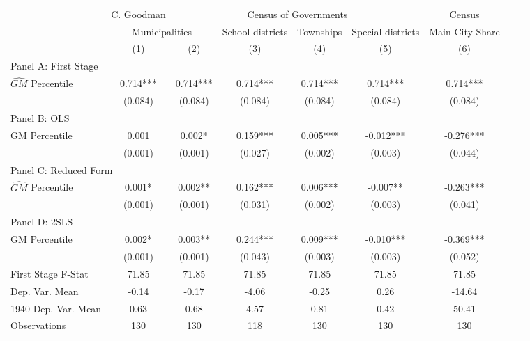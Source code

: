  \begin{tabular}{l*{8}{c}} \toprule
&\multicolumn{1}{c}{C. Goodman}&\multicolumn{4}{c}{Census of Governments}&\multicolumn{1}{c}{Census}\\\cmidrule(lr){2-2}\cmidrule(lr){3-6}\cmidrule(lr){7-7}
&\multicolumn{2}{c}{Municipalities}&\multicolumn{1}{c}{School districts}&\multicolumn{1}{c}{Townships}&\multicolumn{1}{c}{Special districts}&\multicolumn{1}{c}{Main City Share}\\\cmidrule(lr){2-3}\cmidrule(lr){4-6}\cmidrule(lr){7-7}
&\multicolumn{1}{c}{(1)}&\multicolumn{1}{c}{(2)}&\multicolumn{1}{c}{(3)}&\multicolumn{1}{c}{(4)}&\multicolumn{1}{c}{(5)}&\multicolumn{1}{c}{(6)}\\
\cmidrule(lr){1-7}
\multicolumn{6}{l}{Panel A: First Stage}\\
\cmidrule(lr){1-7}
$\widehat{GM}$ Percentile&    0.714***&    0.714***&    0.714***&    0.714***&    0.714***&    0.714***\\
                &  (0.084)   &  (0.084)   &  (0.084)   &  (0.084)   &  (0.084)   &  (0.084)   \\
\cmidrule(lr){1-7}
\multicolumn{6}{l}{Panel B: OLS}\\
\cmidrule(lr){1-7}
GM Percentile   &    0.001   &    0.002*  &    0.159***&    0.005***&   -0.012***&   -0.276***\\
                &  (0.001)   &  (0.001)   &  (0.027)   &  (0.002)   &  (0.003)   &  (0.044)   \\
\cmidrule(lr){1-7}
\multicolumn{6}{l}{Panel C: Reduced Form}\\
\cmidrule(lr){1-7}
$\widehat{GM}$ Percentile&    0.001*  &    0.002** &    0.162***&    0.006***&   -0.007** &   -0.263***\\
                &  (0.001)   &  (0.001)   &  (0.031)   &  (0.002)   &  (0.003)   &  (0.041)   \\
\cmidrule(lr){1-7}
\multicolumn{6}{l}{Panel D: 2SLS}\\
\cmidrule(lr){1-7}
GM Percentile   &    0.002*  &    0.003** &    0.244***&    0.009***&   -0.010***&   -0.369***\\
                &  (0.001)   &  (0.001)   &  (0.043)   &  (0.003)   &  (0.003)   &  (0.052)   \\
\midrule
First Stage F-Stat&    71.85   &    71.85   &    71.85   &    71.85   &    71.85   &    71.85   \\
Dep. Var. Mean  &    -0.14   &    -0.17   &    -4.06   &    -0.25   &     0.26   &   -14.64   \\
1940 Dep. Var. Mean&     0.63   &     0.68   &     4.57   &     0.81   &     0.42   &    50.41   \\
Observations    &      130   &      130   &      118   &      130   &      130   &      130   \\
       \bottomrule \end{tabular}
